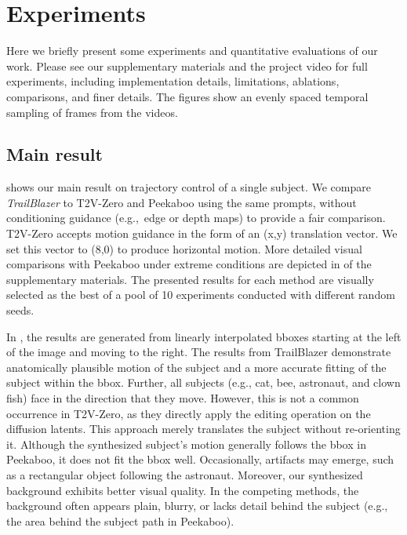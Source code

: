 \section{Experiments}
\label{sec:exp}

Here we briefly present some experiments and quantitative evaluations of our work. Please see our supplementary materials and the project video for full experiments, including implementation details, limitations, ablations, comparisons, and finer details. The figures show an evenly spaced temporal sampling of frames from the videos. 


\subsection{Main result}

 shows our main result on trajectory control of a  single subject. We compare \textit{TrailBlazer} to T2V-Zero \cite{text2video-zero} and Peekaboo \cite{jain2023peekaboo} using the same prompts, without conditioning guidance (e.g.,~edge or depth maps) to provide a fair comparison. T2V-Zero accepts motion guidance in the form of an (x,y) translation vector. We set this vector to (8,0) to produce horizontal motion. More detailed visual comparisons with Peekaboo under extreme conditions are depicted in  of the supplementary materials. The presented results for each method are visually selected as the best of a pool of 10 experiments conducted with different random seeds.

In , the results are generated from linearly interpolated bboxes starting at the left of the image and moving to the right. The results from TrailBlazer demonstrate anatomically plausible motion of the subject and a more accurate fitting of the subject within the bbox. Further, all subjects (e.g., cat, bee, astronaut, and clown fish) face in the direction that they move. However, this is not a common occurrence in T2V-Zero, as they directly apply the editing operation on the diffusion latents. This approach merely translates the subject without re-orienting it. Although the synthesized subject's motion generally follows the bbox in Peekaboo, it does not fit the bbox well. Occasionally, artifacts may emerge, such as a rectangular object following the astronaut. Moreover, our synthesized background exhibits better visual quality. In the competing methods, the background often appears plain, blurry, or lacks detail behind the subject (e.g., the area behind the subject path in Peekaboo).


